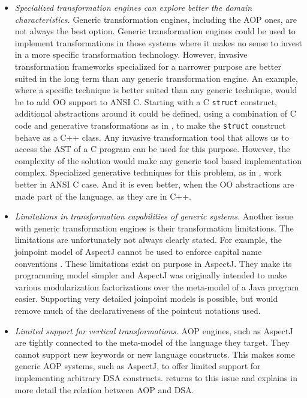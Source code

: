 \begin{itemize}

\item \textit{Specialized transformation engines can explore better the domain characteristics.} Generic transformation engines, including the AOP ones, are not always the best option. Generic transformation engines could be used to implement transformations in those systems where it makes no sense to invest in a more specific transformation technology. However, invasive transformation frameworks specialized for a narrower purpose are better suited in the long term than any generic transformation engine. An example, where a specific technique is better suited than any generic technique, would be to add OO support to ANSI C. Starting with a C \texttt{struct} construct, additional abstractions around it could be defined, using a combination of C code and generative transformations as in \cite{ooc}, to make the \texttt{struct} construct behave as a C++ class. Any invasive transformation tool that allows us to access the AST of a C program can be used for this purpose. However, the complexity of the solution would make any generic tool based implementation complex. Specialized generative techniques for this problem, as in \cite{ooc}, work better in ANSI C case. And it is even better, when the OO abstractions are made part of the language, as they are in C++.

\item \textit{Limitations in transformation capabilities of generic systems.} Another issue with generic transformation engines is their transformation limitations. The limitations are unfortunately not always clearly stated. For example, the joinpoint model of AspectJ cannot be used to enforce capital name conventions \cite{aop.paradox.03}. These limitations exist on purpose in AspectJ. They make its programming model simpler and AspectJ was originally intended to make various modularization factorizations over the meta-model of a Java program easier. Supporting very detailed joinpoint models is possible, but would remove much of the declarativeness of the pointcut notations used. 

\item \textit{Limited support for vertical transformations.} AOP engines, such as AspectJ are tightly connected to the meta-model of the language they target. They cannot support new keywords or new language constructs. This makes some generic AOP systems, such as AspectJ, to offer limited support for implementing arbitrary DSA constructs.  returns to this issue and explains in more detail the relation between AOP and DSA.

\end{itemize}

